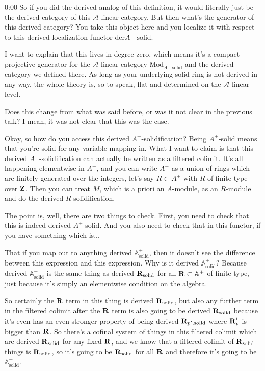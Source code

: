 \begin{unfinished}{0:00}
So if you did the derived analog of this definition, it would literally just be the derived category of this $\mathcal{A}$-linear category. But then what's the generator of this derived category? You take this object here and you localize it with respect to this derived localization functor $\mathrm{der}A^+\text{-solid}$.

I want to explain that this lives in degree zero, which means it's a compact projective generator for the $\mathcal{A}$-linear category $\mathrm{Mod}_{A^+\text{-solid}}$ and the derived category we defined there. As long as your underlying solid ring is not derived in any way, the whole theory is, so to speak, flat and determined on the $\mathcal{A}$-linear level.

Does this change from what was said before, or was it not clear in the previous talk? I mean, it was not clear that this was the case.

Okay, so how do you access this derived $A^+$-solidification? Being $A^+$-solid means that you're solid for any variable mapping in. What I want to claim is that this derived $A^+$-solidification can actually be written as a filtered colimit. It's all happening elementwise in $A^+$, and you can write $A^+$ as a union of rings which are finitely generated over the integers, let's say $R \subset A^+$ with $R$ of finite type over $\mathbf Z$. Then you can treat $M$, which is a priori an $A$-module, as an $R$-module and do the derived $R$-solidification.

The point is, well, there are two things to check. First, you need to check that this is indeed derived $A^+$-solid. And you also need to check that in this functor, if you have something which is...

That if you map out to anything derived $\mathbb{A}^+_{\mathrm{solid}}$, then it doesn't see the difference between this expression and this expression. Why is it derived $\mathbb{A}^+_{\mathrm{solid}}$? Because derived $\mathbb{A}^+_{\mathrm{solid}}$ is the same thing as derived $\mathbf R_{\mathrm{solid}}$ for all $\mathbf R \subset \mathbb{A}^+$ of finite type, just because it's simply an elementwise condition on the algebra.

So certainly the $\mathbf R$ term in this thing is derived $\mathbf R_{\mathrm{solid}}$, but also any further term in the filtered colimit after the $\mathbf R$ term is also going to be derived $\mathbf R_{\mathrm{solid}}$ because it's even has an even stronger property of being derived $\mathbf R_{p',\mathrm{solid}}$ where $\mathbf R_p'$ is bigger than $\mathbf R$. So there's a cofinal system of things in this filtered colimit which are derived $\mathbf R_{\mathrm{solid}}$ for any fixed $\mathbf R$, and we know that a filtered colimit of $\mathbf R_{\mathrm{solid}}$ things is $\mathbf R_{\mathrm{solid}}$, so it's going to be $\mathbf R_{\mathrm{solid}}$ for all $\mathbf R$ and therefore it's going to be $\mathbb{A}^+_{\mathrm{solid}}$.


\end{unfinished}
